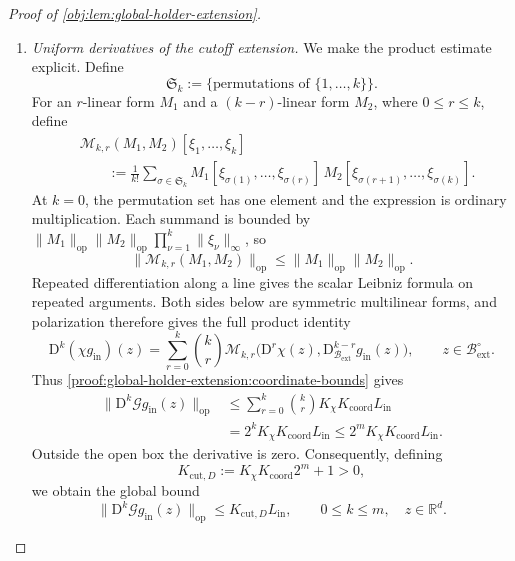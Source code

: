 \begin{proof}[Proof of \cref{obj:lem:global-holder-extension}]
\begin{enumerate}
\item\label{proof:global-holder-extension:cutoff-derivatives} \emph{Uniform derivatives of the cutoff extension.}
We make the product estimate explicit. Define
\[
\mathfrak S_k:=\{\text{permutations of }\{1,\ldots,k\}\}.
\]
For an \(r\)-linear form \(M_1\) and a \((k-r)\)-linear form \(M_2\), where \(0\le r\le k\), define
\[
\begin{aligned}
&\mathcal M_{k,r}(M_1,M_2)[\xi_1,\ldots,\xi_k]\\
&\qquad:=
\frac1{k!}\sum_{\sigma\in\mathfrak S_k}
M_1[\xi_{\sigma(1)},\ldots,\xi_{\sigma(r)}]\,
M_2[\xi_{\sigma(r+1)},\ldots,\xi_{\sigma(k)}].
\end{aligned}
\]
At \(k=0\), the permutation set has one element and the expression is ordinary multiplication. Each summand is bounded by
\(\|M_1\|_{\mathrm{op}}\|M_2\|_{\mathrm{op}}
\prod_{\nu=1}^k\|\xi_\nu\|_\infty\), so
\[
\|\mathcal M_{k,r}(M_1,M_2)\|_{\mathrm{op}}
\le\|M_1\|_{\mathrm{op}}\|M_2\|_{\mathrm{op}}.
\]
Repeated differentiation along a line gives the scalar Leibniz formula on repeated arguments. Both sides below are symmetric multilinear forms, and polarization therefore gives the full product identity
\[
\mathrm D^k(\chi g_{\mathrm{in}})(z)
=
\sum_{r=0}^k\binom{k}{r}
\mathcal M_{k,r}
\bigl(\mathrm D^r\chi(z),
\mathrm D_{\mathcal B_{\mathrm{ext}}}^{k-r}g_{\mathrm{in}}(z)\bigr),
\qquad z\in\mathcal B_{\mathrm{ext}}^\circ.
\]
Thus \cref{proof:global-holder-extension:coordinate-bounds} gives
\[
\begin{aligned}
\|\mathrm D^k\mathscr G g_{\mathrm{in}}(z)\|_{\mathrm{op}}
&\le
\sum_{r=0}^k\binom{k}{r}
K_\chi K_{\mathrm{coord}}L_{\mathrm{in}}\\
&=2^kK_\chi K_{\mathrm{coord}}L_{\mathrm{in}}
\le2^mK_\chi K_{\mathrm{coord}}L_{\mathrm{in}}.
\end{aligned}
\]
Outside the open box the derivative is zero. Consequently, defining
\[
K_{\mathrm{cut},D}:=K_\chi K_{\mathrm{coord}}2^m+1>0,
\]
we obtain the global bound
\[
\|\mathrm D^k\mathscr G g_{\mathrm{in}}(z)\|_{\mathrm{op}}
\le K_{\mathrm{cut},D}L_{\mathrm{in}},
\qquad 0\le k\le m,\quad z\in\mathbb R^d.
\]


\end{enumerate}
\end{proof}
